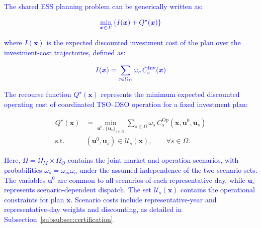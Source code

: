 \documentclass[preprint,12pt]{elsarticle}
\begin{document}
\textcolor{blue}{The shared ESS planning problem can be generically written as:}

\begin{equation}
    \textcolor{blue}{
        \min_{\boldsymbol{x}\in\mathcal{X}}
        \left\{
            I(\boldsymbol{x}) + Q^\star(\boldsymbol{x})
        \right\}
    }
    \label{eq:two_stage_planning_problem}
\end{equation}

\noindent
\textcolor{blue}{where $I(\boldsymbol{x})$ is the expected discounted investment cost of the plan over the investment-cost trajectories, defined as:}

\begin{equation}
    \textcolor{blue}{
        I(\boldsymbol{x}) = \sum_{c\in\Omega_C} \omega_c\, C_c^{\text{Inv}}(\boldsymbol{x})
    }
    \label{eq:investment_cost_generic}
\end{equation}

\noindent
\textcolor{blue}{The recourse function $Q^\star(\boldsymbol{x})$ represents the minimum expected discounted operating cost of coordinated TSO--DSO operation for a fixed investment plan:}

\begin{subequations}
    \begin{align}
        Q^\star(\boldsymbol{x})
        &=
        \min_{\boldsymbol{u}^{0},\,\{\boldsymbol{u}_s\}_{s\in\Omega}}
        \sum_{s\in\Omega}
        \omega_s\,C_s^{\mathrm{Op}}
        \left(\boldsymbol{x},\boldsymbol{u}^{0},\boldsymbol{u}_s\right)
        \\
        \text{s.t.}\quad
        &(\boldsymbol{u}^{0},\boldsymbol{u}_s)
        \in\mathcal{U}_s(\boldsymbol{x}),
        \qquad \forall s\in\Omega .
    \end{align}
    \label{eq:operational_recourse_function}
\end{subequations}

\noindent
\textcolor{blue}{
    Here, $\Omega=\Omega_M\times\Omega_O$ contains the joint market and operation scenarios, with probabilities $\omega_s=\omega_m\omega_o$ under the assumed independence of the two scenario sets. 
    The variables $\boldsymbol{u}^{0}$ are common to all scenarios of each representative day, while $\boldsymbol{u}_s$ represents scenario-dependent dispatch.
    The set $\mathcal{U}_s(\boldsymbol{x})$ contains the operational constraints for plan $\boldsymbol{x}$.
    Scenario costs include representative-year and representative-day weights and discounting, as detailed in Subsection~\ref{subsubsec:certification}.
}
\end{document}
